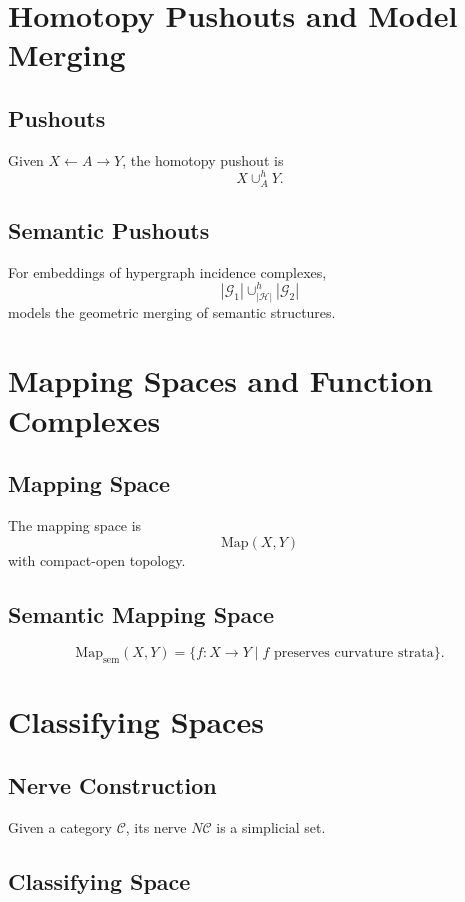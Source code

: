 \section{Homotopy Pushouts and Model Merging}

\subsection{Pushouts}

Given $X\leftarrow A\to Y$, the homotopy pushout is
\[
X \cup^{h}_A Y.
\]

\subsection{Semantic Pushouts}

For embeddings of hypergraph incidence complexes,
\[
|\mathcal{G}_1| \cup^{h}_{|\mathcal{H}|} |\mathcal{G}_2|
\]
models the geometric merging of semantic structures.

\section{Mapping Spaces and Function Complexes}

\subsection{Mapping Space}

The mapping space is
\[
\mathrm{Map}(X,Y)
\]
with compact-open topology.

\subsection{Semantic Mapping Space}

\[
\mathrm{Map}_{\mathrm{sem}}(X,Y)
  = \{ f:X\to Y \mid f \text{ preserves curvature strata} \}.
\]

\section{Classifying Spaces}

\subsection{Nerve Construction}

Given a category $\mathcal{C}$, its nerve $N\mathcal{C}$ is a simplicial set.

\subsection{Classifying Space}

